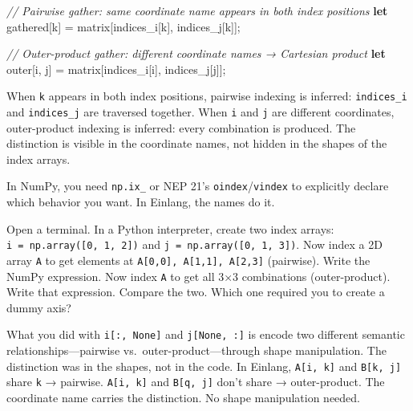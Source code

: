 \documentclass[11pt,titlepage]{article}
\newenvironment{Shaded}{}{}
\newcommand{\CommentTok}[1]{\textcolor[rgb]{0.38,0.63,0.69}{\textit{#1}}}
\newcommand{\KeywordTok}[1]{\textcolor[rgb]{0.00,0.44,0.13}{\textbf{#1}}}
\newcommand{\NormalTok}[1]{#1}
\newcommand{\OperatorTok}[1]{\textcolor[rgb]{0.40,0.40,0.40}{#1}}
\begin{document}
\begin{Shaded}
\begin{Highlighting}[]
\CommentTok{// Pairwise gather: same coordinate name appears in both index positions}
\KeywordTok{let}\NormalTok{ gathered}\OperatorTok{[}\NormalTok{k}\OperatorTok{]}\NormalTok{ = matrix}\OperatorTok{[}\NormalTok{indices_i}\OperatorTok{[}\NormalTok{k}\OperatorTok{]}\NormalTok{, indices_j}\OperatorTok{[}\NormalTok{k}\OperatorTok{]]}\NormalTok{;}

\CommentTok{// Outer-product gather: different coordinate names → Cartesian product}
\KeywordTok{let}\NormalTok{ outer}\OperatorTok{[}\NormalTok{i, j}\OperatorTok{]}\NormalTok{ = matrix}\OperatorTok{[}\NormalTok{indices_i}\OperatorTok{[}\NormalTok{i}\OperatorTok{]}\NormalTok{, indices_j}\OperatorTok{[}\NormalTok{j}\OperatorTok{]]}\NormalTok{;}
\end{Highlighting}
\end{Shaded}

When \texttt{k} appears in both index positions, pairwise indexing is
inferred: \texttt{indices\_i} and \texttt{indices\_j} are traversed
together. When \texttt{i} and \texttt{j} are different coordinates,
outer-product indexing is inferred: every combination is produced. The
distinction is visible in the coordinate names, not hidden in the shapes
of the index arrays.

In NumPy, you need \texttt{np.ix\_} or NEP 21's
\texttt{oindex}/\texttt{vindex} to explicitly declare which behavior you
want. In Einlang, the names do it.

Open a terminal. In a Python interpreter, create two index arrays:
\texttt{i\ =\ np.array({[}0,\ 1,\ 2{]})} and
\texttt{j\ =\ np.array({[}0,\ 1,\ 3{]})}. Now index a 2D array
\texttt{A} to get elements at
\texttt{A{[}0,0{]},\ A{[}1,1{]},\ A{[}2,3{]}} (pairwise). Write the
NumPy expression. Now index \texttt{A} to get all 3×3 combinations
(outer-product). Write that expression. Compare the two. Which one
required you to create a dummy axis?

What you did with \texttt{i{[}:,\ None{]}} and \texttt{j{[}None,\ :{]}}
is encode two different semantic relationships---pairwise
vs.~outer-product---through shape manipulation. The distinction was in
the shapes, not in the code. In Einlang, \texttt{A{[}i,\ k{]}} and
\texttt{B{[}k,\ j{]}} share \texttt{k} → pairwise. \texttt{A{[}i,\ k{]}}
and \texttt{B{[}q,\ j{]}} don't share → outer-product. The coordinate
name carries the distinction. No shape manipulation needed.
\end{document}
